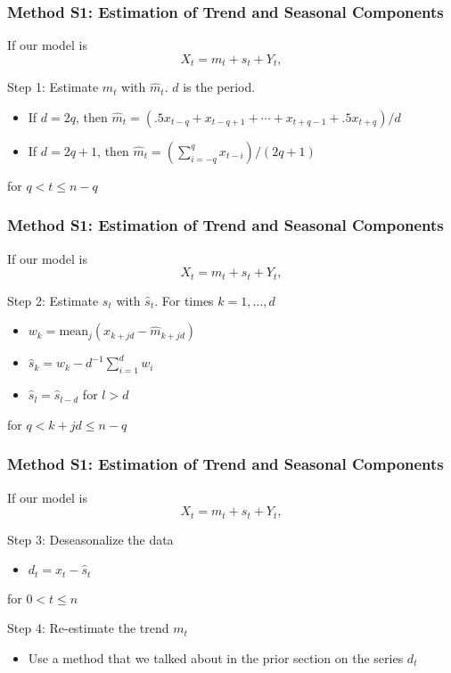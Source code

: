 \documentclass{beamer}
\begin{document}
\begin{frame}
\frametitle{Method S1: Estimation of Trend and Seasonal Components}

If our model is 
\[
X_t = m_t + s_t + Y_t,
\]

Step 1: Estimate $m_t$ with $\hat{m}_t$. $d$ is the period. 
\begin{itemize}
\item If $d=2q$, then $\hat{m}_t = (.5 x_{t-q} + x_{t-q+1} + \cdots + x_{t+q-1} + .5 x_{t+q})/d$
\item If $d=2q+1$, then $\hat{m}_t = (\sum_{i=-q}^q x_{t-i})/(2q+1)$
\end{itemize}
for $q < t \le n-q$
\end{frame}


\begin{frame}
\frametitle{Method S1: Estimation of Trend and Seasonal Components}

If our model is 
\[
X_t = m_t + s_t + Y_t,
\]

Step 2: Estimate $s_t$ with $\hat{s}_t$. For times $k=1,\ldots,d$
\begin{itemize}
\item $w_k = \text{mean}_{j}( x_{k+jd} - \hat{m}_{k+jd} ) $
\item $\hat{s}_k = w_k - d^{-1}\sum_{i=1}^d w_i$ 
\item $\hat{s}_l = \hat{s}_{l-d}$ for $l > d$
\end{itemize}
for $q < k + jd \le n-q$

\end{frame}


\begin{frame}
\frametitle{Method S1: Estimation of Trend and Seasonal Components}

If our model is 
\[
X_t = m_t + s_t + Y_t,
\]

Step 3: Deseasonalize the data
\begin{itemize}
\item $d_t = x_t - \hat{s}_t$
\end{itemize}
for $0 < t \le n$
\newline

Step 4: Re-estimate the trend $m_t$
\begin{itemize}
\item Use a method that we talked about in the prior section on the series $d_t$
\end{itemize}
\end{frame}
\end{document}
